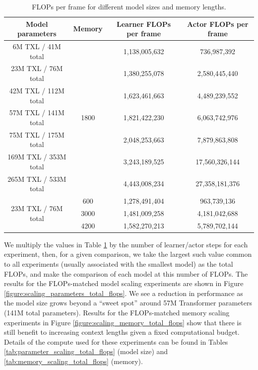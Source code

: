 \begin{table}[t!]
  \begin{center}
    \caption{FLOPs per frame for different model sizes and memory lengths.}
    \begin{tabular}{c|c|c|c}
    \label{tab:flops}
      Model parameters & Memory & Learner FLOPs per frame & Actor FLOPs per frame \\
      \hline
      6M TXL / 41M total & \multirow{7}{*}{1800} & 1,138,005,632 & 736,987,392\\
      23M TXL / 76M total & & 1,380,255,078 & 2,580,445,440\\
      42M TXL / 112M total & & 1,623,461,663 & 4,489,239,552\\
      57M TXL / 141M total & & 1,821,422,230 & 6,063,742,976\\
      75M TXL / 175M total & & 2,048,253,663 & 7,879,863,808\\
      169M TXL / 353M total & & 3,243,189,525 & 17,560,326,144\\
      265M TXL / 533M total & & 4,443,008,234 & 27,358,181,376\\
      \multirow{3}{*}{23M TXL / 76M total } & 600 & 1,278,491,404 & 963,739,136\\
      & 3000 & 1,481,009,258 & 4,181,042,688\\
      & 4200 & 1,582,270,213 & 5,789,702,144\\
    \end{tabular}
  \end{center}
\end{table}

We multiply the values in Table \ref{tab:flops} by the number of learner/actor steps for each experiment, then,
for a given comparison, we take the largest such value common to all experiments (usually associated with the smallest model) as the total FLOPs, and make the comparison of each model at this number of FLOPs. The results for the FLOPs-matched model scaling experiments are shown in Figure \ref{figure:scaling_parameters_total_flops}. We see a reduction in performance as the model size grows beyond a ``sweet spot'' around 57M Transformer parameters (141M total parameters). Results for the FLOPs-matched memory scaling experiments in Figure \ref{figure:scaling_memory_total_flops} show that there is still benefit to increasing context lengths given a fixed computational budget. Details of the compute used for these experiments can be found in Tables \ref{tab:parameter_scaling_total_flops} (model size) and \ref{tab:memory_scaling_total_flops} (memory).

